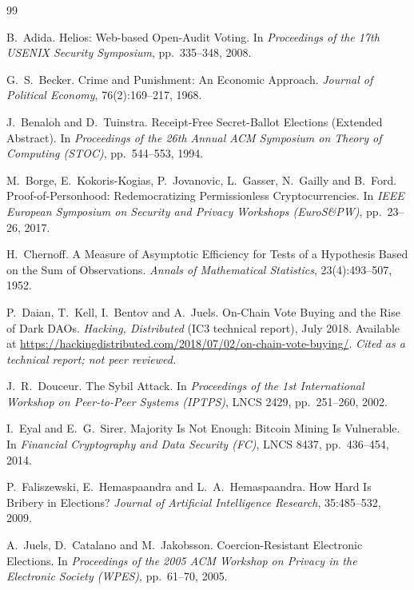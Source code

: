 \documentclass[11pt,a4paper]{article}
\begin{document}
\clearpage
{}
\begin{thebibliography}{99}

 B.~Adida. Helios: Web-based Open-Audit Voting. In
\emph{Proceedings of the 17th USENIX Security Symposium}, pp.~335--348, 2008.

 G.~S.~Becker. Crime and Punishment: An Economic Approach.
\emph{Journal of Political Economy}, 76(2):169--217, 1968.

 J.~Benaloh and D.~Tuinstra. Receipt-Free Secret-Ballot
Elections (Extended Abstract). In \emph{Proceedings of the 26th Annual ACM
Symposium on Theory of Computing (STOC)}, pp.~544--553, 1994.

 M.~Borge, E.~Kokoris-Kogias, P.~Jovanovic, L.~Gasser,
N.~Gailly and B.~Ford. Proof-of-Personhood: Redemocratizing Permissionless
Cryptocurrencies. In \emph{IEEE European Symposium on Security and Privacy
Workshops (EuroS\&PW)}, pp.~23--26, 2017.

 H.~Chernoff. A Measure of Asymptotic Efficiency for Tests
of a Hypothesis Based on the Sum of Observations. \emph{Annals of Mathematical
Statistics}, 23(4):493--507, 1952.

 P.~Daian, T.~Kell, I.~Bentov and A.~Juels. On-Chain Vote
Buying and the Rise of Dark DAOs. \emph{Hacking, Distributed} (IC3 technical
report), July 2018. Available at
\url{https://hackingdistributed.com/2018/07/02/on-chain-vote-buying/}.
\emph{Cited as a technical report; not peer reviewed.}

 J.~R.~Douceur. The Sybil Attack. In \emph{Proceedings of
the 1st International Workshop on Peer-to-Peer Systems (IPTPS)}, LNCS 2429,
pp.~251--260, 2002.

 I.~Eyal and E.~G.~Sirer. Majority Is Not Enough: Bitcoin
Mining Is Vulnerable. In \emph{Financial Cryptography and Data Security (FC)},
LNCS 8437, pp.~436--454, 2014.

 P.~Faliszewski, E.~Hemaspaandra and
L.~A.~Hemaspaandra. How Hard Is Bribery in Elections? \emph{Journal of
Artificial Intelligence Research}, 35:485--532, 2009.

 A.~Juels, D.~Catalano and M.~Jakobsson. Coercion-Resistant
Electronic Elections. In \emph{Proceedings of the 2005 ACM Workshop on Privacy
in the Electronic Society (WPES)}, pp.~61--70, 2005.


\end{thebibliography}
\end{document}
